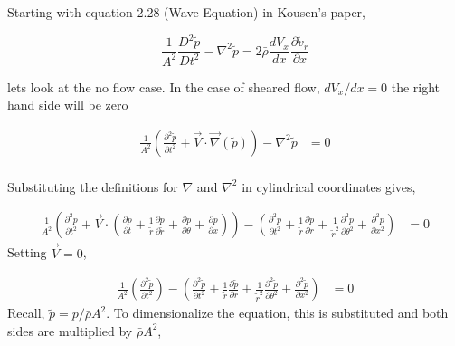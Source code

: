 \documentclass[a4paper]{report}
\begin{document}
Starting with equation 2.28 (Wave Equation) in Kousen's paper,



\begin{equation}
    \frac{1}{A^2}\frac{D^2\tilde{p}}{Dt^2} -
    \nabla^2 \tilde{p} =
    2 \bar{\rho} \frac{d V_x}{d x} \frac{\partial  \tilde{v}_r}{ \partial x} 
    \label{eqn:KousensWaveEquation}
\end{equation}


lets look at the no flow case. In the case of sheared flow, $dV_x/dx = 0$ the right hand side will be zero 



\begin{align*}
    \frac{1}{A^2}\left(
        \frac{\partial^2 \tilde{p}}{\partial t^2} + 
        \vec{V}\cdot \vec {\nabla} (\tilde{p}) 
    \right) -
    \nabla^2
    \tilde{p} &=
    0 \\
\end{align*}

Substituting the definitions for $\nabla$ and $\nabla^2$ in cylindrical 
coordinates gives,

\begin{align*} 
    \frac{1}{A^2}\left(
        \frac{\partial^2 \tilde{p}}{\partial t^2}
    + 
        \vec{V}\cdot \left(
            \frac{\partial\tilde{p}}{\partial t} + 
            \frac{1}{\tilde{r}}\frac{\partial \tilde{p} }{\partial \tilde{r}} +
            \frac{\partial \tilde{p}}{\partial \theta} +
            \frac{\partial \tilde{p}}{\partial x}  
        \right)  \right)-
        \left(
            \frac{\partial^2 \tilde{p}}{\partial t^2} + 
            \frac{1}{\tilde{r}}\frac{\partial \tilde{p}}{\partial r} +
            \frac{1}{\tilde{r}^2} \frac{\partial^2 \tilde{p}}{\partial \theta^2} + 
            \frac{\partial^2 \tilde{p}}{\partial x^2} 
        \right) &= 0  
\end{align*} 
Setting $\vec{V} = 0$,

\begin{align*} 
    \frac{1}{A^2}\left(
        \frac{\partial^2 \tilde{p}}{\partial t^2}
    \right) - 
        \left(
            \frac{\partial^2 \tilde{p}}{\partial t^2} + 
            \frac{1}{\tilde{r}}\frac{\partial \tilde{p}}{\partial  r}  +
            \frac{1}{\tilde{r}^2} \frac{\partial^2 \tilde{p}}{\partial \theta^2} + 
            \frac{\partial^2 \tilde{p}}{\partial x^2} 
        \right) &= 0  
\end{align*} 
Recall, $\tilde{p} = p/\bar{\rho} A^2$. To dimensionalize the equation, this is
substituted and both sides are multiplied by $\bar{\rho}A^2$,
\end{document}
